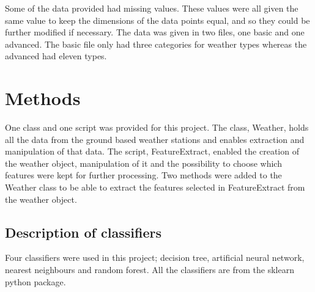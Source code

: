 \documentclass[12pt]{article}
\begin{document}
\newpage

Some of the data provided had missing values. These values were all given the same value to keep the dimensions of the data points equal, and so they could be further modified if necessary.
\newline
The data was given in two files, one basic and one advanced. The basic file only had three categories for weather types whereas the advanced had eleven types.

\section{Methods}
One class and one script was provided for this project. The class, Weather, holds all the data from the ground based weather stations and enables \newline extraction and manipulation of that data. The script, FeatureExtract, \newline enabled the creation of the weather object, manipulation of it and the \newline possibility to choose which features were kept for further processing. Two methods were added to the Weather class to be able to extract the features selected in FeatureExtract from the weather object.
\subsection{Description of classifiers}
Four classifiers were used in this project; decision tree, artificial neural \newline network, nearest neighbours and random forest. All the classifiers are from the sklearn python package.
\end{document}
